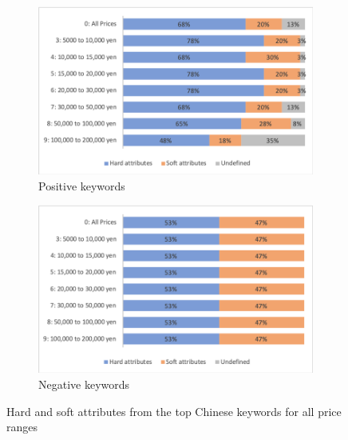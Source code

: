 \documentclass[smallextended,natbib]{svjour3}       %
\begin{document}
  \begin{figure}[ht]
      \centering
      \begin{subfigure}[b]{0.45\textwidth}
          \includegraphics[width=\textwidth]{hard_soft_attr_zh_pos.png}
          \caption{Positive keywords}
      \end{subfigure}
      \begin{subfigure}[b]{0.45\textwidth}
          \includegraphics[width=\textwidth]{hard_soft_attr_zh_neg.png}
          \caption{Negative keywords}
      \end{subfigure}
  \caption{Hard and soft attributes from the top Chinese keywords for all price ranges}
  \label{fig:hard_soft_zh}
  \end{figure}
\end{document}
